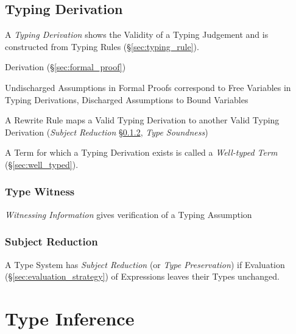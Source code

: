 \subsection{Typing Derivation}\label{sec:typing_derivation}

A \emph{Typing Derivation} shows the Validity of a Typing Judgement
and is constructed from Typing Rules (\S\ref{sec:typing_rule}).

Derivation (\S\ref{sec:formal_proof})

Undischarged Assumptions in Formal Proofs correspond to Free Variables
in Typing Derivations, Discharged Assumptions to Bound Variables

A Rewrite Rule maps a Valid Typing Derivation to another Valid Typing
Derivation (\emph{Subject Reduction} \S\ref{sec:subject_reduction},
\emph{Type Soundness}) \cite{wadler14}

A Term for which a Typing Derivation exists is called a
\emph{Well-typed Term} (\S\ref{sec:well_typed}).



\subsubsection{Type Witness}\label{sec:type_witness}

\emph{Witnessing Information} gives verification of a Typing
Assumption



\subsubsection{Subject Reduction}\label{sec:subject_reduction}

A Type System has \emph{Subject Reduction} (or \emph{Type
  Preservation}) if Evaluation (\S\ref{sec:evaluation_strategy}) of
Expressions leaves their Types unchanged.



\section{Type Inference}\label{sec:type_inference}

